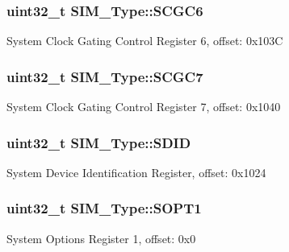 \subsubsection[{\texorpdfstring{S\+C\+G\+C6}{SCGC6}}]{ uint32\+\_\+t S\+I\+M\+\_\+\+Type\+::\+S\+C\+G\+C6}\hypertarget{structSIM__Type_ae14fa2f76246338c738acd9a19e5e2f0}{}\label{structSIM__Type_ae14fa2f76246338c738acd9a19e5e2f0}
System Clock Gating Control Register 6, offset\+: 0x103C 
\subsubsection[{\texorpdfstring{S\+C\+G\+C7}{SCGC7}}]{ uint32\+\_\+t S\+I\+M\+\_\+\+Type\+::\+S\+C\+G\+C7}\hypertarget{structSIM__Type_a53e80dc738a9dceaaa230afd667e3fd2}{}\label{structSIM__Type_a53e80dc738a9dceaaa230afd667e3fd2}
System Clock Gating Control Register 7, offset\+: 0x1040 
\subsubsection[{\texorpdfstring{S\+D\+ID}{SDID}}]{ uint32\+\_\+t S\+I\+M\+\_\+\+Type\+::\+S\+D\+ID}\hypertarget{structSIM__Type_ada1141c7fe188d49a47eeeabc068dfce}{}\label{structSIM__Type_ada1141c7fe188d49a47eeeabc068dfce}
System Device Identification Register, offset\+: 0x1024 
\subsubsection[{\texorpdfstring{S\+O\+P\+T1}{SOPT1}}]{ uint32\+\_\+t S\+I\+M\+\_\+\+Type\+::\+S\+O\+P\+T1}\hypertarget{structSIM__Type_a71da199104a0c6df7a9b6ef58c5e4edb}{}\label{structSIM__Type_a71da199104a0c6df7a9b6ef58c5e4edb}
System Options Register 1, offset\+: 0x0 
